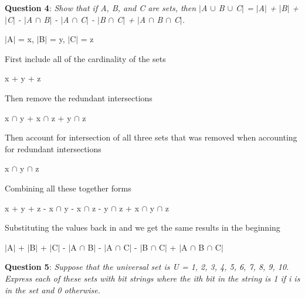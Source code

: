\documentclass{article} %
\newcommand{\question}[2][]{\begin{flushleft}
        \textbf{Question #1}: \textit{#2}

\end{flushleft}}
\begin{document}
  \question[4]{Show that if A, B, and C are sets, then $\mid$A $\cup$ B $\cup$ C$\mid$ = $\mid$A$\mid$ + $\mid$B$\mid$ + $\mid$C$\mid$ - $\mid$A $\cap$ B$\mid$ - $\mid$A $\cap$ C$\mid$ - $\mid$B $\cap$ C$\mid$ + $\mid$A $\cap$ B $\cap$ C$\mid$.}

  $\mid$A$\mid$ = x,
  $\mid$B$\mid$ = y,
  $\mid$C$\mid$ = z

  First include all of the cardinality of the sets

  x + y + z

  Then remove the redundant intersections

  x $\cap$ y + x $\cap$ z + y $\cap$ z

  Then account for intersection of all three sets that was removed when accounting for redundant intersections

  x $\cap$ y $\cap$ z

  Combining all these together forms

  x + y + z - x $\cap$ y - x $\cap$ z - y $\cap$ z + x $\cap$ y $\cap$ z

  Substituting the values back in and we get the same results in the beginning

  $\mid$A$\mid$ + $\mid$B$\mid$ + $\mid$C$\mid$ - $\mid$A $\cap$ B$\mid$ - $\mid$A $\cap$ C$\mid$ - $\mid$B $\cap$ C$\mid$ + $\mid$A $\cap$ B $\cap$ C$\mid$



  \question[5]{Suppose that the universal set is U = 1, 2, 3, 4, 5, 6, 7, 8, 9, 10. Express each of
  these sets with bit strings where the ith bit in the string is 1 if i is in the set and 0 otherwise.}
\end{document}
